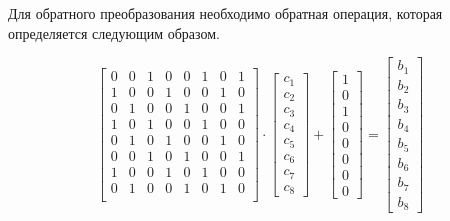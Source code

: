 Для обратного преобразования необходимо обратная операция, которая определяется
следующим образом.

\begin{equation*}
    \begin{bmatrix}
        0 & 0 & 1 & 0 & 0 & 1 & 0 & 1 \\
        1 & 0 & 0 & 1 & 0 & 0 & 1 & 0 \\
        0 & 1 & 0 & 0 & 1 & 0 & 0 & 1 \\
        1 & 0 & 1 & 0 & 0 & 1 & 0 & 0 \\
        0 & 1 & 0 & 1 & 0 & 0 & 1 & 0 \\
        0 & 0 & 1 & 0 & 1 & 0 & 0 & 1 \\
        1 & 0 & 0 & 1 & 0 & 1 & 0 & 0 \\
        0 & 1 & 0 & 0 & 1 & 0 & 1 & 0 \\
    \end{bmatrix}
    \cdot
    \begin{bmatrix}
        c_1 \\
        c_2 \\
        c_3 \\
        c_4 \\
        c_5 \\
        c_6 \\
        c_7 \\
        c_8
    \end{bmatrix}
    +
    \begin{bmatrix}
        1 \\
        0 \\
        1 \\
        0 \\
        0 \\
        0 \\
        0 \\
        0
    \end{bmatrix}
    =
    \begin{bmatrix}
        b_1 \\
        b_2 \\
        b_3 \\
        b_4 \\
        b_5 \\
        b_6 \\
        b_7 \\
        b_8
    \end{bmatrix}
\end{equation*}

